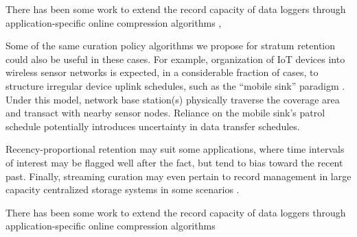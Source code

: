 There has been some work to extend the record capacity of data loggers through application-specific online compression algorithms \citep{hadiatna2016design},

Some of the same curation policy algorithms we propose for stratum retention could also be useful in these cases.
For example, organization of IoT devices into wireless sensor networks is expected, in a considerable fraction of cases, to structure irregular device uplink schedules, such as the ``mobile sink'' paradigm \citep{jain2022survey}.
Under this model, network base station(s) physically traverse the coverage area and transact with nearby sensor nodes.
Reliance on the mobile sink's patrol schedule potentially introduces uncertainty in data transfer schedules.

Recency-proportional retention may suit some applications, where time intervals of interest may be flagged well after the fact, but tend to bias toward the recent past.
Finally, streaming curation may even pertain to record management in large capacity centralized storage systems in some scenarios \citep{bhat2018data}.


There has been some work to extend the record capacity of data loggers through application-specific online compression algorithms \citep{hadiatna2016design}

